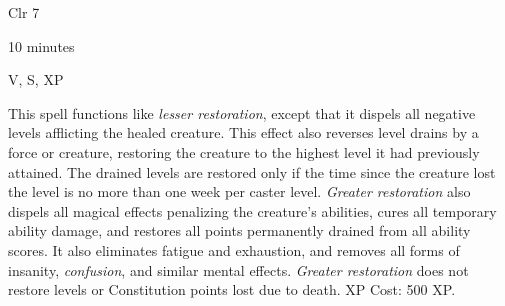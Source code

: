 
\begin{description*}
\item[Level:] Clr 7
\item[Casting Time:] 10 minutes
\item[Components:] V, S, XP
\end{description*}

This spell functions like \textit{lesser restoration}, except that it dispels all
negative levels afflicting the healed creature. This effect also reverses level
drains by a force or creature, restoring the creature to the highest level it had
previously attained. The drained levels are restored only if the time since the
creature lost the level is no more than one week per caster level.
\textit{Greater restoration} also dispels all magical effects penalizing the creature's
abilities, cures all temporary ability damage, and restores all points permanently
drained from all ability scores. It also eliminates fatigue and exhaustion, and
removes all forms of insanity, \textit{confusion}, and similar mental effects.
\textit{Greater restoration} does not restore levels or Constitution points lost
due to death.
XP Cost: 500 XP.